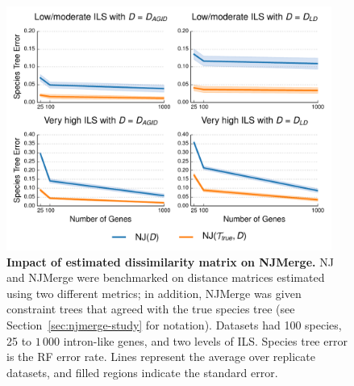 \vspace{12pt}

\begin{figure}[!h]
\centering
\includegraphics[width=0.95\textwidth]{figures/njmerge-fig5.pdf}
\caption{
{\bf Impact of estimated dissimilarity matrix on NJMerge. }
NJ and NJMerge were benchmarked on distance matrices estimated using two different metrics; in addition, NJMerge was given constraint trees that agreed with the true species tree (see Section~\ref{sec:njmerge-study} for notation).
Datasets had 100 species, 25 to $1\,000$ intron-like genes, and two levels of ILS.
Species tree error is the RF error rate.
Lines represent the average over replicate datasets, and filled regions indicate the standard error.
}
\label{fig:true-intron}
\end{figure}

